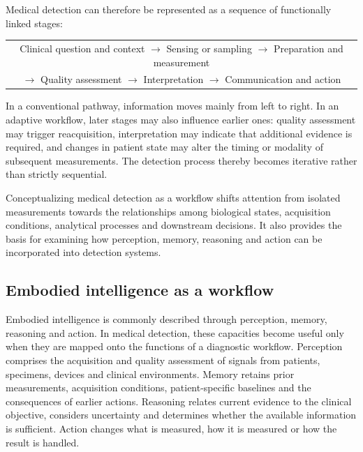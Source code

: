 \documentclass[12pt,a4paper]{article}
\begin{document}
Medical detection can therefore be represented as a sequence of functionally linked stages:

\begin{center}
\begin{tabular}{c}
Clinical question and context
$\rightarrow$
Sensing or sampling
$\rightarrow$
Preparation and measurement
\\[0.4em]
$\rightarrow$
Quality assessment
$\rightarrow$
Interpretation
$\rightarrow$
Communication and action
\end{tabular}
\end{center}

In a conventional pathway, information moves mainly from left to right. In an adaptive workflow, later stages may also influence earlier ones: quality assessment may trigger reacquisition, interpretation may indicate that additional evidence is required, and changes in patient state may alter the timing or modality of subsequent measurements. The detection process thereby becomes iterative rather than strictly sequential.


Conceptualizing medical detection as a workflow shifts attention from isolated measurements towards the relationships among biological states, acquisition conditions, analytical processes and downstream decisions. It also provides the basis for examining how perception, memory, reasoning and action can be incorporated into detection systems.


\subsection{Embodied intelligence as a workflow}
\label{subsec:embodied_intelligence_workflow}

Embodied intelligence is commonly described through perception, memory,
reasoning and action. In medical detection, these capacities become useful
only when they are mapped onto the functions of a diagnostic workflow.
Perception comprises the acquisition and quality assessment of signals from
patients, specimens, devices and clinical environments. Memory retains prior
measurements, acquisition conditions, patient-specific baselines and the
consequences of earlier actions. Reasoning relates current evidence to the
clinical objective, considers uncertainty and determines whether the
available information is sufficient. Action changes what is measured, how
it is measured or how the result is handled.
\end{document}
